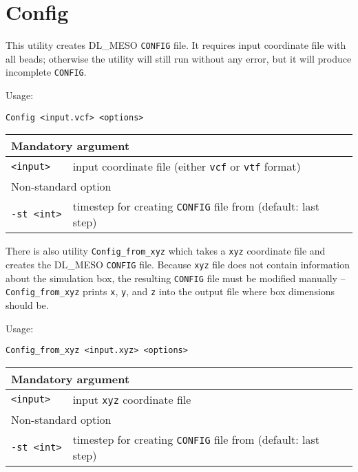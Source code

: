 \section{Config} \label{sec:Config}

This utility creates DL\_MESO \texttt{CONFIG} file. It requires input
coordinate file with all beads; otherwise the utility will still run
without any error, but it will produce incomplete \texttt{CONFIG}.

Usage:

\vspace{1em}
\noindent
\texttt{Config <input.vcf> <options>}

\vspace{1em}

\noindent
\begin{tabular}{p{}p{}}
  \toprule
  \multicolumn{2}{l}{Mandatory argument} \\
  \midrule
  \texttt{<input>}  & input coordinate file (either \texttt{vcf} or
    \texttt{vtf} format)\\
  \toprule
  \multicolumn{2}{l}{Non-standard option} \\
  \midrule
  \texttt{-st <int>} & timestep for creating \texttt{CONFIG} file from
    (default: last step) \\
  \bottomrule
\end{tabular}

\vspace{1em}
There is also utility \texttt{Config\_from\_xyz} which takes a \texttt{xyz}
coordinate file and creates the DL\_MESO \texttt{CONFIG} file. Because
\texttt{xyz} file does not contain information about the simulation box,
the resulting \texttt{CONFIG} file must be modified manually --
\texttt{Config\_from\_xyz} prints \texttt{x}, \texttt{y}, and \texttt{z}
into the output file where box dimensions should be.

Usage:

\vspace{1em}
\noindent
\texttt{Config\_from\_xyz <input.xyz> <options>}

\vspace{1em}

\noindent
\begin{tabular}{p{}p{}}
  \toprule
  \multicolumn{2}{l}{Mandatory argument} \\
  \midrule
  \texttt{<input>}  & input \texttt{xyz} coordinate file \\
  \toprule
  \multicolumn{2}{l}{Non-standard option} \\
  \midrule
  \texttt{-st <int>} & timestep for creating \texttt{CONFIG} file from
    (default: last step) \\
  \bottomrule
\end{tabular}
